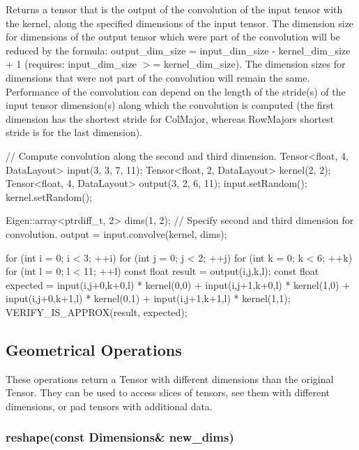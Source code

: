Returns a tensor that is the output of the convolution of the input tensor with the kernel, along the specified dimensions of the input tensor. The dimension size for dimensions of the output tensor which were part of the convolution will be reduced by the formula\+: output\+\_\+dim\+\_\+size = input\+\_\+dim\+\_\+size -\/ kernel\+\_\+dim\+\_\+size + 1 (requires\+: input\+\_\+dim\+\_\+size $>$= kernel\+\_\+dim\+\_\+size). The dimension sizes for dimensions that were not part of the convolution will remain the same. Performance of the convolution can depend on the length of the stride(s) of the input tensor dimension(s) along which the convolution is computed (the first dimension has the shortest stride for Col\+Major, whereas Row\+Major\textquotesingle{}s shortest stride is for the last dimension). \begin{DoxyVerb}// Compute convolution along the second and third dimension.
Tensor<float, 4, DataLayout> input(3, 3, 7, 11);
Tensor<float, 2, DataLayout> kernel(2, 2);
Tensor<float, 4, DataLayout> output(3, 2, 6, 11);
input.setRandom();
kernel.setRandom();

Eigen::array<ptrdiff_t, 2> dims({1, 2});  // Specify second and third dimension for convolution.
output = input.convolve(kernel, dims);

for (int i = 0; i < 3; ++i) {
  for (int j = 0; j < 2; ++j) {
    for (int k = 0; k < 6; ++k) {
      for (int l = 0; l < 11; ++l) {
        const float result = output(i,j,k,l);
        const float expected = input(i,j+0,k+0,l) * kernel(0,0) +
                               input(i,j+1,k+0,l) * kernel(1,0) +
                               input(i,j+0,k+1,l) * kernel(0,1) +
                               input(i,j+1,k+1,l) * kernel(1,1);
        VERIFY_IS_APPROX(result, expected);
      }
    }
  }
}
\end{DoxyVerb}


\subsection*{Geometrical Operations}

These operations return a Tensor with different dimensions than the original Tensor. They can be used to access slices of tensors, see them with different dimensions, or pad tensors with additional data.

\subsubsection*{reshape(const Dimensions\& new\+\_\+dims)}


